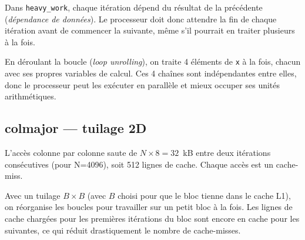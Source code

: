 \documentclass[a4paper,12pt]{article}
\begin{document}
Dans \texttt{heavy\_work}, chaque itération dépend du résultat de la précédente
(\textit{dépendance de données}). Le processeur doit donc attendre la fin de chaque
itération avant de commencer la suivante, même s'il pourrait en traiter plusieurs à la fois.

En déroulant la boucle (\textit{loop unrolling}), on traite 4 éléments de \texttt{x}
à la fois, chacun avec ses propres variables de calcul. Ces 4 chaînes sont indépendantes
entre elles, donc le processeur peut les exécuter en parallèle et mieux occuper ses
unités arithmétiques.

\subsection{colmajor — tuilage 2D}

L'accès colonne par colonne saute de $N \times 8 = 32$~kB entre deux itérations
consécutives (pour N=4096), soit 512 lignes de cache. Chaque accès est un cache-miss.

Avec un tuilage $B \times B$ (avec $B$ choisi pour que le bloc tienne dans le cache L1),
on réorganise les boucles pour travailler sur un petit bloc à la fois. Les lignes de cache
chargées pour les premières itérations du bloc sont encore en cache pour les suivantes,
ce qui réduit drastiquement le nombre de cache-misses.
\end{document}
